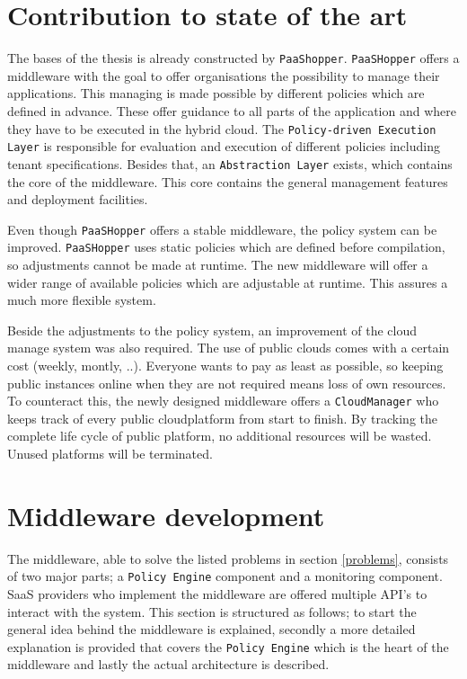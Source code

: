 \documentclass[journal]{IEEEtran}
\begin{document}
\section{Contribution to state of the art}
The bases of the thesis is already constructed by \texttt{PaaShopper}\cite{PaaSHopper}.
\texttt{PaaSHopper} offers a middleware with the goal to offer organisations the possibility to manage their applications.
This managing is made possible by different policies which are defined in advance.
These offer guidance to all parts of the application and where they have to be executed in the hybrid cloud.
The \texttt{Policy-driven Execution Layer} is responsible for evaluation and execution of different policies including tenant specifications.
Besides that, an \texttt{Abstraction Layer} exists, which contains the core of the middleware.
This core contains the general management features and deployment facilities.\newline

Even though \texttt{PaaSHopper} offers a stable middleware, the policy system can be improved.
\texttt{PaaSHopper} uses static policies which are defined before compilation, so adjustments cannot be made at runtime.
The new middleware will offer a wider range of available policies which are adjustable at runtime.
This assures a much more flexible system.

Beside the adjustments to the policy system, an improvement of the cloud manage system was also required.
The use of public clouds comes with a certain cost (weekly, montly, ..).
Everyone wants to pay as least as possible, so keeping public instances online when they are not required means loss of own resources.
To counteract this, the newly designed middleware offers a \texttt{CloudManager} who keeps track of every public cloudplatform from start to finish.
By tracking the complete life cycle of public platform, no additional resources will be wasted.
Unused platforms will be terminated.

\section{Middleware development}
The middleware, able to solve the listed problems in section \ref{problems}, consists of two major parts; a \texttt{Policy Engine} component and a monitoring component.
SaaS providers who implement the middleware are offered multiple API's to interact with the system.
This section is structured as follows; to start the general idea behind the middleware is explained, secondly a more detailed explanation is provided that covers the \texttt{Policy Engine} which is the heart of the middleware and lastly the actual architecture is described.
\end{document}
